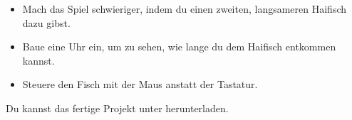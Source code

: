 \documentclass{article}
\begin{document}

\begin{itemize}
    \item Mach das Spiel schwieriger, indem du einen zweiten, langsameren Haifisch dazu gibst.
    \item Baue eine Uhr ein, um zu sehen, wie lange du dem Haifisch entkommen kannst.
    \item Steuere den Fisch mit der Maus anstatt der Tastatur.
\end{itemize}


Du kannst das fertige Projekt unter %
herunterladen.
\end{document}

